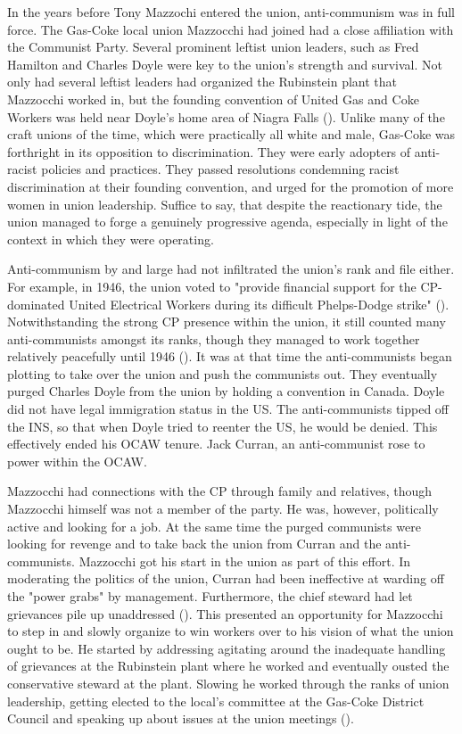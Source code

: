\documentclass[12pt]{article}
\begin{document}
In the years before Tony Mazzochi entered the union, anti-communism was in full force. The Gas-Coke local union Mazzocchi had joined had a close affiliation with the Communist Party. Several prominent leftist union leaders, such as Fred Hamilton and Charles Doyle were key to the union’s strength and survival. Not only had several leftist leaders had organized the Rubinstein plant that Mazzocchi worked in, but the founding convention of United Gas and Coke Workers was held near Doyle’s home area of Niagra Falls (\cite[81]{leopoldManWhoHated2007}). Unlike many of the craft unions of the time, which were practically all white and male, Gas-Coke was forthright in its opposition to discrimination. They were early adopters of anti-racist policies and practices. They passed resolutions condemning racist discrimination at their founding convention, and urged for the promotion of more women in union leadership. Suffice to say, that despite the reactionary tide, the union managed to forge a genuinely progressive agenda, especially in light of the context in which they were operating.

Anti-communism by and large had not infiltrated the union’s rank and file either. For example, in 1946, the union voted to "provide financial support for the CP-dominated United Electrical Workers during its difficult Phelps-Dodge strike" (\cite[84]{leopoldManWhoHated2007}). Notwithstanding the strong CP presence within the union, it still counted many anti-communists amongst its ranks, though they managed to work together relatively peacefully until 1946 (\cite[84]{leopoldManWhoHated2007}). It was at that time the anti-communists began plotting to take over the union and push the communists out. They eventually purged Charles Doyle from the union by holding a convention in Canada. Doyle did not have legal immigration status in the US. The anti-communists tipped off the INS, so that when Doyle tried to reenter the US, he would be denied. This effectively ended his OCAW tenure. Jack Curran, an anti-communist rose to power within the OCAW.

Mazzocchi had connections with the CP through family and relatives, though Mazzocchi himself was not a member of the party. He was, however, politically active and looking for a job. At the same time the purged communists were looking for revenge and to take back the union from Curran and the anti-communists. Mazzocchi got his start in the union as part of this effort. In moderating the politics of the union, Curran had been ineffective at warding off the "power grabs" by management. Furthermore, the chief steward had let grievances pile up unaddressed (\cite[90]{leopoldManWhoHated2007}). This presented an opportunity for Mazzocchi to step in and slowly organize to win workers over to his vision of what the union ought to be. He started by addressing agitating around the inadequate handling of grievances at the Rubinstein plant where he worked and eventually ousted the conservative steward at the plant. Slowing he worked through the ranks of union leadership, getting elected to the local’s committee at the Gas-Coke District Council and speaking up about issues at the union meetings (\cite[97--98]{leopoldManWhoHated2007}). 
\end{document}
